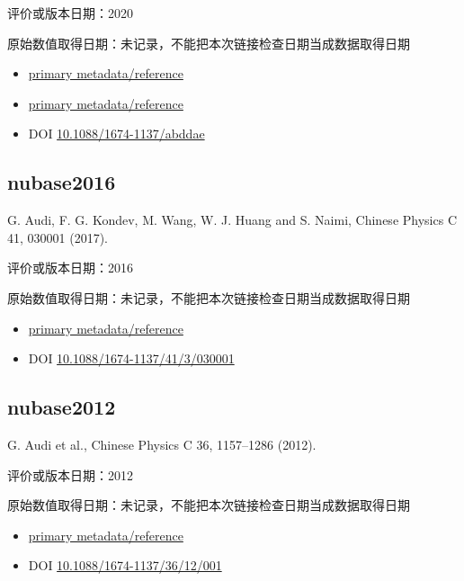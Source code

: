\documentclass[
  11pt,
  letterpaper,
]{article}
\providecommand{\tightlist}{%
  \setlength{\itemsep}{0pt}\setlength{\parskip}{0pt}}
\begin{document}
评价或版本日期：2020

原始数值取得日期：未记录，不能把本次链接检查日期当成数据取得日期

\begin{itemize}
\tightlist
\item
  \href{https://cpc.ihep.ac.cn/article/doi/10.1088/1674-1137/abddae}{primary
  metadata/reference}
\item
  \href{https://www-nds.iaea.org/amdc/}{primary metadata/reference}
\item
  DOI
  \href{https://doi.org/10.1088/1674-1137/abddae}{10.1088/1674-1137/abddae}
\end{itemize}

\subsection{nubase2016}\label{nubase2016}

G. Audi, F. G. Kondev, M. Wang, W. J. Huang and S. Naimi, Chinese
Physics C 41, 030001 (2017).

评价或版本日期：2016

原始数值取得日期：未记录，不能把本次链接检查日期当成数据取得日期

\begin{itemize}
\tightlist
\item
  \href{https://cpc.ihep.ac.cn/article/doi/10.1088/1674-1137/41/3/030001}{primary
  metadata/reference}
\item
  DOI
  \href{https://doi.org/10.1088/1674-1137/41/3/030001}{10.1088/1674-1137/41/3/030001}
\end{itemize}

\subsection{nubase2012}\label{nubase2012}

G. Audi et al., Chinese Physics C 36, 1157--1286 (2012).

评价或版本日期：2012

原始数值取得日期：未记录，不能把本次链接检查日期当成数据取得日期

\begin{itemize}
\tightlist
\item
  \href{https://cpc.ihep.ac.cn/article/doi/10.1088/1674-1137/36/12/001}{primary
  metadata/reference}
\item
  DOI
  \href{https://doi.org/10.1088/1674-1137/36/12/001}{10.1088/1674-1137/36/12/001}
\end{itemize}
\end{document}
